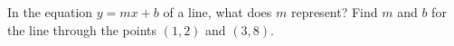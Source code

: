 In the equation $y=mx+b$ of a line, what does $m$ represent? Find $m$ and $b$ for the line through the points $(1,2)$ and $(3,8)$.
